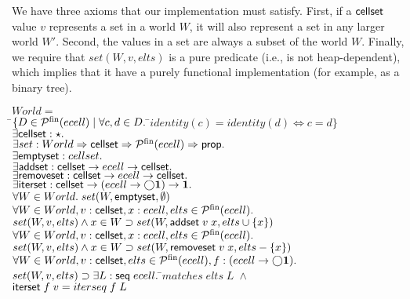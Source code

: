 We have three axioms that our implementation must satisfy. First, if a
$\mathsf{cellset}$ value $v$ represents a set in a world $W$, it will also
represent a set in any larger world $W'$. Second, the values in a set
are always a subset of the world $W$. Finally, we require that
$set(W,v,elts)$ is a pure predicate (i.e., is not heap-dependent),
which implies that it have a purely functional implementation (for
example, as a binary tree). 


\begin{tabbing}
$World = $ \\
\;\;\;\;\=$\{D \in \mathcal{P}^{\mathrm{fin}}(ecell)\;|\;\forall c,d \in D.\;$\=$identity(c) = identity(d) \iff c = d\}$\\[1em]

$\exists \mathsf{cellset} : \star.$ \\
$\exists set : World \Rightarrow \mathsf{cellset} \Rightarrow \mathcal{P}^{\mathrm{fin}}(ecell) \Rightarrow \mathsf{prop}.$ \\
$\exists \mathsf{emptyset}    : cellset.$ \\
$\exists \mathsf{addset}      : \mathsf{cellset} \to ecell \to \mathsf{cellset}.$ \\
$\exists \mathsf{removeset}   : \mathsf{cellset} \to ecell \to \mathsf{cellset}.$ \\
$\exists \mathsf{iterset}     : \mathsf{cellset} \to (ecell \to \bigcirc{\mathbf{1}}) \to \mathbf{1}.$\\[1em]

$\forall W \in World.\; set(W, \mathsf{emptyset}, \emptyset)$ \\[1em]


$\forall W \in World, v : \mathsf{cellset}, x : ecell, elts \in \mathcal{P}^{\mathrm{fin}}(ecell).$ \\ 
\> $set(W, v, elts) \land x \in W \supset set(W, \mathsf{addset}\;v\;x, elts \cup \{{x}\})$ \\[1em]


$\forall W \in World, v : \mathsf{cellset}, x : ecell, elts \in \mathcal{P}^{\mathrm{fin}}(ecell).$ \\ 
\> $set(W, v, elts) \land x \in W \supset set(W, \mathsf{removeset}\;v\;x, elts - \{{x}\})$ \\[1em]


$\forall W \in World, v : \mathsf{cellset}, elts \in \mathcal{P}^{\mathrm{fin}}(ecell), 
         f : (ecell \to \bigcirc{\mathbf{1}}).$ \\ 
\> $set(W, v, elts) \supset \exists L : \mathsf{seq}\;{ecell}.\;$\=$matches\;elts\;L\; \land$ \\
\>                                \>$\mathsf{iterset}\;f\;v = iterseq\;f\;L$ \\[1em]



\end{tabbing}
